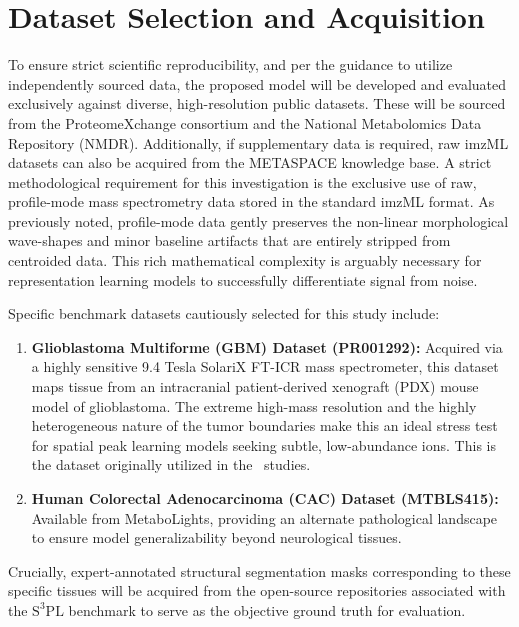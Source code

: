 \documentclass[
12pt, %
oneside, %
english, %
onehalfspacing, %
nolistspacing, %
headsepline, %
]{MastersDoctoralThesis} %
\begin{document}

\section{Dataset Selection and Acquisition}

To ensure strict scientific reproducibility, and per the guidance to utilize independently sourced data, the proposed model will be developed and evaluated exclusively against diverse, high-resolution public datasets. These will be sourced from the ProteomeXchange consortium and the National Metabolomics Data Repository (NMDR). Additionally, if supplementary data is required, raw imzML datasets can also be acquired from the METASPACE knowledge base. A strict methodological requirement for this investigation is the exclusive use of raw, profile-mode mass spectrometry data stored in the standard imzML format. As previously noted, profile-mode data gently preserves the non-linear morphological wave-shapes and minor baseline artifacts that are entirely stripped from centroided data. This rich mathematical complexity is arguably necessary for representation learning models to successfully differentiate signal from noise.

Specific benchmark datasets cautiously selected for this study include:
\begin{enumerate}
    \item \textbf{Glioblastoma Multiforme (GBM) Dataset (PR001292):} Acquired via a highly sensitive 9.4 Tesla SolariX FT-ICR mass spectrometer, this dataset maps tissue from an intracranial patient-derived xenograft (PDX) mouse model of glioblastoma. The extreme high-mass resolution and the highly heterogeneous nature of the tumor boundaries make this an ideal stress test for spatial peak learning models seeking subtle, low-abundance ions. This is the dataset originally utilized in the~\citet{abdelmoula2022massnet} studies.
    \item \textbf{Human Colorectal Adenocarcinoma (CAC) Dataset (MTBLS415):} Available from MetaboLights, providing an alternate pathological landscape to ensure model generalizability beyond neurological tissues.
\end{enumerate}

Crucially, expert-annotated structural segmentation masks corresponding to these specific tissues will be acquired from the open-source repositories associated with the $\text{S}^{3}\text{PL}$ benchmark to serve as the objective ground truth for evaluation.~\citep{weigand2026spatial}
\end{document}
